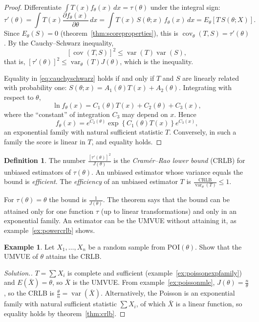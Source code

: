 \documentclass[12pt,a4paper]{report}
\theoremstyle{definition}
\newtheorem{defn}[thm]{Definition}
\newtheorem{exa}[thm]{Example}
\DeclareMathOperator{\var}{var}
\DeclareMathOperator{\cov}{cov}
\newenvironment{solution}
  {\renewcommand{\qedsymbol}{}\begin{proof}[\textit{Solution}.]}
  {\end{proof}}
\begin{document}
\begin{proof}
Differentiate $\int T(x)f_\theta(x)\,dx = \tau(\theta)$ under the integral sign:
\[\tau'(\theta) = \int T(x)\frac{\partial f_\theta(x)}{\partial\theta}\,dx
= \int T(x)\,S(\theta; x)\,f_\theta(x)\,dx = E_\theta\left[T\,S(\theta; X)\right].\]
Since $E_\theta(S) = 0$ (theorem~\ref{thm:scoreproperties}), this is
$\cov_\theta(T, S) = \tau'(\theta)$. By the Cauchy--Schwarz inequality,
\begin{equation}
\label{eq:cauchyschwarz}
\left[\cov(T, S)\right]^2\le\var(T)\var(S),
\end{equation}
that is, $\left[\tau'(\theta)\right]^2\le\var_\theta(T)J(\theta)$, which is the
inequality.

Equality in \eqref{eq:cauchyschwarz} holds if and only if $T$ and $S$ are linearly
related with probability one: $S(\theta; x) = A_1(\theta)T(x) + A_2(\theta)$.
Integrating with respect to $\theta$,
\[\ln f_\theta(x) = C_1(\theta)T(x) + C_2(\theta) + C_3(x),\]
where the ``constant'' of integration $C_3$ may depend on $x$. Hence
\[f_\theta(x) = e^{C_2(\theta)}\exp\left\{C_1(\theta)T(x)\right\}e^{C_3(x)},\]
an exponential family with natural sufficient statistic $T$. Conversely, in such a
family the score is linear in $T$, and equality holds.
\end{proof}

\begin{defn}
\label{def:efficient}
The number $\frac{\left[\tau'(\theta)\right]^2}{J(\theta)}$ is the
\emph{Cram\'er--Rao lower bound} (CRLB) for unbiased estimators of $\tau(\theta)$. An
unbiased estimator whose variance equals the bound is \emph{efficient}. The
\emph{efficiency} of an unbiased estimator $T$ is
$\frac{\text{CRLB}}{\var_\theta(T)}\le 1$.
\end{defn}

For $\tau(\theta) = \theta$ the bound is $\frac{1}{J(\theta)}$. The theorem says that the
bound can be attained only for one function $\tau$ (up to linear transformations)
and only in an exponential family. An estimator can be the UMVUE without attaining
it, as example~\ref{ex:powercrlb} shows.

\begin{exa}
\label{ex:poissoncrlb}
Let $X_1, \dots, X_n$ be a random sample from $\text{POI}(\theta)$. Show that the
UMVUE of $\theta$ attains the CRLB.
\end{exa}

\begin{solution}
$T = \sum X_i$ is complete and sufficient (example~\ref{ex:poissonexpfamily}) and
$E(\bar X) = \theta$, so $\bar X$ is the UMVUE. From example~\ref{ex:poissonmle},
$J(\theta) = \frac n\theta$, so the CRLB is $\frac\theta n = \var(\bar X)$. Alternatively,
the Poisson is an exponential family with natural sufficient statistic $\sum X_i$, of
which $\bar X$ is a linear function, so equality holds by theorem~\ref{thm:crlb}.
\end{solution}
\end{document}
